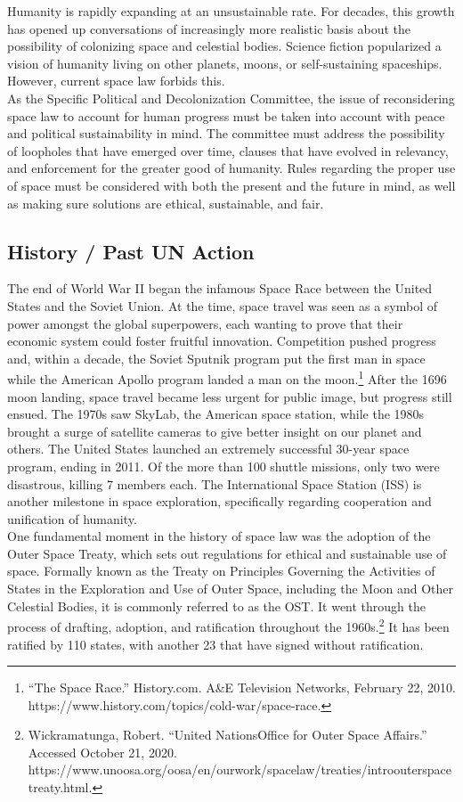 \documentclass[10pt, letterpaper]{article}
\begin{document}
Humanity is rapidly expanding at an unsustainable rate. For decades,
this growth has opened up conversations of increasingly more realistic
basis about the possibility of colonizing space and celestial bodies.
Science fiction popularized a vision of humanity living on other
planets, moons, or self-sustaining spaceships. However, current space
law forbids this. \\

As the Specific Political and Decolonization Committee, the issue of
reconsidering space law to account for human progress must be taken into
account with peace and political sustainability in mind. The committee
must address the possibility of loopholes that have emerged over time,
clauses that have evolved in relevancy, and enforcement for the greater
good of humanity. Rules regarding the proper use of space must be
considered with both the present and the future in mind, as well as
making sure solutions are ethical, sustainable, and fair. 

\subsection{History / Past UN Action}

The end of World War II began the infamous Space Race between the United
States and the Soviet Union. At the time, space travel was seen as a
symbol of power amongst the global superpowers, each wanting to prove
that their economic system could foster fruitful innovation. Competition
pushed progress and, within a decade, the Soviet Sputnik program put the
first man in space while the American Apollo program landed a man on the
moon.\footnote{``The Space Race.'' History.com. A\&E Television
  Networks, February 22, 2010.
  https://www.history.com/topics/cold-war/space-race.} After the 1696
moon landing, space travel became less urgent for public image, but
progress still ensued. The 1970s saw SkyLab, the American space station,
while the 1980s brought a surge of satellite cameras to give better
insight on our planet and others. The United States launched an
extremely successful 30-year space program, ending in 2011. Of the more
than 100 shuttle missions, only two were disastrous, killing 7 members
each. The International Space Station (ISS) is another milestone in
space exploration, specifically regarding cooperation and unification of
humanity. \\

One fundamental moment in the history of space law was the adoption of
the Outer Space Treaty, which sets out regulations for ethical and
sustainable use of space. Formally known as the Treaty on Principles
Governing the Activities of States in the Exploration and Use of Outer
Space, including the Moon and Other Celestial Bodies, it is commonly
referred to as the OST. It went through the process of drafting,
adoption, and ratification throughout the 1960s.\footnote{Wickramatunga,
  Robert. ``United NationsOffice for Outer Space Affairs.'' Accessed
  October 21, 2020.
  https://www.unoosa.org/oosa/en/ourwork/spacelaw/treaties/introouterspacetreaty.html.}
It has been ratified by 110 states, with another 23 that have signed
without ratification. \\
\end{document}

